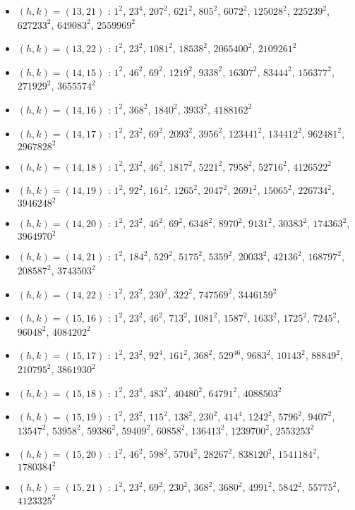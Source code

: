 \begin{itemize}
\item $(h,k)=(13,21)$ : $1^{2}$, $23^{4}$, $207^{2}$, $621^{2}$, $805^{2}$, $6072^{2}$, $125028^{2}$, $225239^{2}$, $627233^{2}$, $649083^{2}$, $2559969^{2}$
\item $(h,k)=(13,22)$ : $1^{2}$, $23^{2}$, $1081^{2}$, $18538^{2}$, $2065400^{2}$, $2109261^{2}$
\item $(h,k)=(14,15)$ : $1^{2}$, $46^{2}$, $69^{2}$, $1219^{2}$, $9338^{2}$, $16307^{2}$, $83444^{2}$, $156377^{2}$, $271929^{2}$, $3655574^{2}$
\item $(h,k)=(14,16)$ : $1^{2}$, $368^{2}$, $1840^{2}$, $3933^{2}$, $4188162^{2}$
\item $(h,k)=(14,17)$ : $1^{2}$, $23^{2}$, $69^{2}$, $2093^{2}$, $3956^{2}$, $123441^{2}$, $134412^{2}$, $962481^{2}$, $2967828^{2}$
\item $(h,k)=(14,18)$ : $1^{2}$, $23^{2}$, $46^{2}$, $1817^{2}$, $5221^{2}$, $7958^{2}$, $52716^{2}$, $4126522^{2}$
\item $(h,k)=(14,19)$ : $1^{2}$, $92^{2}$, $161^{2}$, $1265^{2}$, $2047^{2}$, $2691^{2}$, $15065^{2}$, $226734^{2}$, $3946248^{2}$
\item $(h,k)=(14,20)$ : $1^{2}$, $23^{2}$, $46^{2}$, $69^{2}$, $6348^{2}$, $8970^{2}$, $9131^{2}$, $30383^{2}$, $174363^{2}$, $3964970^{2}$
\item $(h,k)=(14,21)$ : $1^{2}$, $184^{2}$, $529^{2}$, $5175^{2}$, $5359^{2}$, $20033^{2}$, $42136^{2}$, $168797^{2}$, $208587^{2}$, $3743503^{2}$
\item $(h,k)=(14,22)$ : $1^{2}$, $23^{2}$, $230^{2}$, $322^{2}$, $747569^{2}$, $3446159^{2}$
\item $(h,k)=(15,16)$ : $1^{2}$, $23^{2}$, $46^{2}$, $713^{2}$, $1081^{2}$, $1587^{2}$, $1633^{2}$, $1725^{2}$, $7245^{2}$, $96048^{2}$, $4084202^{2}$
\item $(h,k)=(15,17)$ : $1^{2}$, $23^{2}$, $92^{4}$, $161^{2}$, $368^{2}$, $529^{46}$, $9683^{2}$, $10143^{2}$, $88849^{2}$, $210795^{2}$, $3861930^{2}$
\item $(h,k)=(15,18)$ : $1^{2}$, $23^{4}$, $483^{2}$, $40480^{2}$, $64791^{2}$, $4088503^{2}$
\item $(h,k)=(15,19)$ : $1^{2}$, $23^{2}$, $115^{2}$, $138^{2}$, $230^{2}$, $414^{4}$, $1242^{2}$, $5796^{2}$, $9407^{2}$, $13547^{2}$, $53958^{2}$, $59386^{2}$, $59409^{2}$, $60858^{2}$, $136413^{2}$, $1239700^{2}$, $2553253^{2}$
\item $(h,k)=(15,20)$ : $1^{2}$, $46^{2}$, $598^{2}$, $5704^{2}$, $28267^{2}$, $838120^{2}$, $1541184^{2}$, $1780384^{2}$
\item $(h,k)=(15,21)$ : $1^{2}$, $23^{2}$, $69^{2}$, $230^{2}$, $368^{2}$, $3680^{2}$, $4991^{2}$, $5842^{2}$, $55775^{2}$, $4123325^{2}$

\end{itemize}

